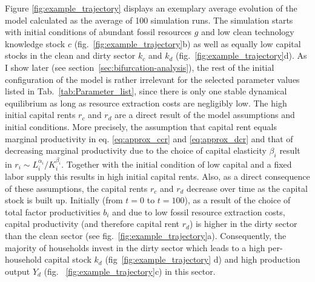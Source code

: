 Figure \ref{fig:example_trajectory} displays an exemplary average evolution of the model calculated as the average of 100 simulation runs.
The simulation starts with initial conditions of abundant fossil resources $g$ and low clean technology knowledge stock $c$ (fig.~\ref{fig:example_trajectory}b) as well as equally low capital stocks in the clean and dirty sector $k_c$ and $k_d$ (fig.~\ref{fig:example_trajectory}d). As I show later (see section~\ref{sec:bifurcation-analysis}), the rest of the initial configuration of the model is rather irrelevant for the selected parameter values listed in Tab.~\ref{tab:Parameter_list}, since there is only one stable dynamical equilibrium as long as resource extraction costs are negligibly low.
The high initial capital rents $r_c$ and $r_d$ are a direct result of the model assumptions and initial conditions. More precisely, the assumption that capital rent equals marginal productivity in eq. \eqref{eq:approx_ccr} and \eqref{eq:approx_dcr} and that of decreasing marginal productivity due to the choice of capital elasticity $\beta_i$  result in $r_i \sim L_i^{\alpha_i}/K_i^{\beta_i}$. Together with the initial condition of low capital and a fixed labor supply this results in high initial capital rents. Also, as a direct consequence of these assumptions, the capital rents $r_c$ and $r_d$ decrease over time as the capital stock is built up.
Initially (from $t=0$ to $t=100$), as a result of the choice of total factor productivities $b_i$ and due to low fossil resource extraction costs, capital productivity (and therefore capital rent $r_d$) is higher in the dirty sector than the clean sector (see fig.~\ref{fig:example_trajectory}a). 
Consequently, the majority of households invest in the dirty sector which leads to a high per-household capital stock $k_d$ (fig~\ref{fig:example_trajectory} d) and high production output $Y_d$ (fig. ~\ref{fig:example_trajectory}c) in this sector.

